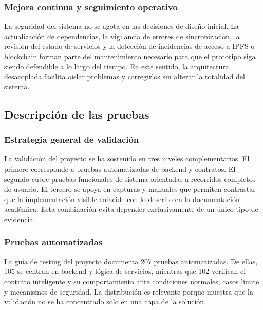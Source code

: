 \documentclass[11pt, a4paper]{article}
\begin{document}
\subsubsection{Mejora continua y seguimiento operativo}

La seguridad del sistema no se agota en las decisiones de diseño inicial. La actualización de dependencias, la vigilancia de errores de sincronización, la revisión del estado de servicios y la detección de incidencias de acceso a IPFS o blockchain forman parte del mantenimiento necesario para que el prototipo siga siendo defendible a lo largo del tiempo. En este sentido, la arquitectura desacoplada facilita aislar problemas y corregirlos sin alterar la totalidad del sistema.

\subsection{Descripción de las pruebas}

\subsubsection{Estrategia general de validación}

La validación del proyecto se ha sostenido en tres niveles complementarios. El primero corresponde a pruebas automatizadas de backend y contratos. El segundo cubre pruebas funcionales de sistema orientadas a recorridos completos de usuario. El tercero se apoya en capturas y manuales que permiten contrastar que la implementación visible coincide con lo descrito en la documentación académica. Esta combinación evita depender exclusivamente de un único tipo de evidencia.

\subsubsection{Pruebas automatizadas}

La guía de testing del proyecto documenta 207 pruebas automatizadas. De ellas, 105 se centran en backend y lógica de servicios, mientras que 102 verifican el contrato inteligente y su comportamiento ante condiciones normales, casos límite y mecanismos de seguridad. La distribución es relevante porque muestra que la validación no se ha concentrado solo en una capa de la solución.
\end{document}

